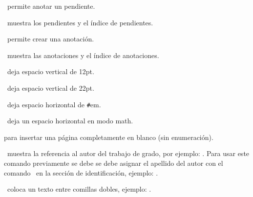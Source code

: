 

\pa\ permite anotar un pendiente.

\ muestra los pendientes y el índice de pendientes.


\pa\ permite crear una anotación.

\ muestra las anotaciones y el índice de anotaciones.


\ deja espacio vertical de 12pt.

\ deja espacio vertical de 22pt.

\pa[\#]\ deja espacio horizontal de \texttt{\#}em.

\ deja un espacio horizontal en modo math.

 para insertar una página completamente en blanco (sin enumeración).


\ muestra la referencia al autor del trabajo de grado, por ejemplo: \yo. Para usar este comando previamente se debe
se debe asignar el apellido del autor con el comando \ en la sección de identificación, ejemplo: .

\ coloca un texto entre comillas dobles, ejemplo: .
